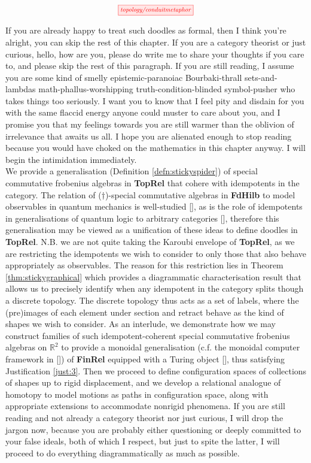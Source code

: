 \begin{fullwidth}
\[\scalebox{0.75}{\tikzfig{topology/conduitmetaphor}}\]

If you are already happy to treat such doodles as formal, then I think you're alright, you can skip the rest of this chapter. If you are a category theorist or just curious, hello, how are you, please do write me to share your thoughts if you care to, and please skip the rest of this paragraph. If you are still reading, I assume you are some kind of smelly epistemic-paranoiac Bourbaki-thrall sets-and-lambdas math-phallus-worshipping truth-condition-blinded symbol-pusher who takes things too seriously. I want you to know that I feel pity and disdain for you with the same flaccid energy anyone could muster to care about you, and I promise you that my feelings towards you are still warmer than the oblivion of irrelevance that awaits us all. I hope you are alienated enough to stop reading because you would have choked on the mathematics in this chapter anyway. I will begin the intimidation immediately.\\

We provide a generalisation (Definition \ref{defn:stickyspider}) of special commutative frobenius algebras in \textbf{TopRel} that cohere with idempotents in the category. The relation of ($\dagger$)-special commutative algebras in \textbf{FdHilb} to model observables in quantum mechanics is well-studied [], as is the role of idempotents in generalisations of quantum logic to arbitrary categories [], therefore this generalisation may be viewed as a unification of these ideas to define doodles in \textbf{TopRel}. N.B. we are not quite taking the Karoubi envelope of \textbf{TopRel}, as we are restricting the idempotents we wish to consider to only those that also behave appropriately as observables. The reason for this restriction lies in Theorem \ref{thm:stickygraphical} which provides a diagrammatic characterisation result that allows us to precisely identify when any idempotent in the category splits though a discrete topology. The discrete topology thus acts as a set of labels, where the (pre)images of each element under section and retract behave as the kind of shapes we wish to consider. As an interlude, we demonstrate how we may construct families of such idempotent-coherent special commutative frobenius algebras on $\mathbb{R}^2$ to provide a monoidal generalisation (c.f. the monoidal computer framework in []) of \textbf{FinRel} equipped with a Turing object [], thus satisfying Justification \ref{just:3}. Then we proceed to define configuration spaces of collections of shapes up to rigid displacement, and we develop a relational analogue of homotopy to model motions as paths in configuration space, along with appropriate extensions to accommodate nonrigid phenomena. If you are still reading and not already a category theorist nor just curious, I will drop the jargon now, because you are probably either questioning or deeply committed to your false ideals, both of which I respect, but just to spite the latter, I will proceed to do everything diagrammatically as much as possible.


\end{fullwidth}
